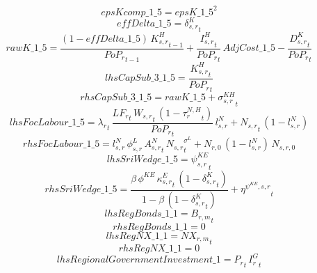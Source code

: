 \begin{dmath*}
epsKcomp\_1\_5 = {epsK\_1\_5}^{2}
\end{dmath*}
\begin{dmath*}
effDelta\_1\_5 = {{\delta^{K}_{s,r}}}_{t}
\end{dmath*}
\begin{dmath*}
rawK\_1\_5 = \frac{\left(1-{effDelta\_1\_5}\right)\, {{K^H_{s,r}}}_{t-1}}{{{PoP_r}}_{t-1}}+\frac{{{I^H_{s,r}}}_{t}}{{{PoP_r}}_{t}}\, {AdjCost\_1\_5}-\frac{{{D^K_{s,r}}}_{t}}{{{PoP_r}}_{t}}
\end{dmath*}
\begin{dmath*}
lhsCapSub\_3\_1\_5 = \frac{{{K^H_{s,r}}}_{t}}{{{PoP_r}}_{t}}
\end{dmath*}
\begin{dmath*}
rhsCapSub\_3\_1\_5 = {rawK\_1\_5}+{{\sigma^{KH}_{s,r}}}_{t}
\end{dmath*}
\begin{dmath*}
lhsFocLabour\_1\_5 = {\lambda_r}_{t}\, \frac{{{LF_r}}_{t}\, {{W_{s,r}}}_{t}\, \left(1-{{\tau^{N,H}_{r}}}_{t}\right)}{{{PoP_r}}_{t}}\, {{l^{N}_{s,r}}}+{{N_{s,r}}}_{t}\, \left(1-{{l^{N}_{s,r}}}\right)
\end{dmath*}
\begin{dmath*}
rhsFocLabour\_1\_5 = {{l^{N}_{s,r}}}\, {{\phi^{L}_{s,r}}}\, {{A^{N}_{s,r}}}_{t}\, {{N_{s,r}}}_{t}^{{{\sigma^{L}}}}+{{N_{r,0}}}\, \left(1-{{l^{N}_{s,r}}}\right)\, {{N_{s,r,0}}}
\end{dmath*}
\begin{dmath*}
lhsSriWedge\_1\_5 = {{\psi^{KE}_{s,r}}}_{t}
\end{dmath*}
\begin{dmath*}
rhsSriWedge\_1\_5 = \frac{{{\beta}}\, {{\phi^{KE}}}\, {{\kappa^{E}_{s,r}}}_{t}\, \left(1-{{\delta^{K}_{s,r}}}_{t}\right)}{1-{{\beta}}\, \left(1-{{\delta^{K}_{s,r}}}_{t}\right)}+{{\eta^{\psi^{KE},s,r}}}_{t}
\end{dmath*}
\begin{dmath*}
lhsRegBonds\_1\_1 = {{B_{r,m}}}_{t}
\end{dmath*}
\begin{dmath*}
rhsRegBonds\_1\_1 = 0
\end{dmath*}
\begin{dmath*}
lhsRegNX\_1\_1 = {{NX_{r,m}}}_{t}
\end{dmath*}
\begin{dmath*}
rhsRegNX\_1\_1 = 0
\end{dmath*}
\begin{dmath*}
lhsRegionalGovernmentInvestment\_1 = {{P_{r}}}_{t}\, {{I^G_{r}}}_{t}
\end{dmath*}

